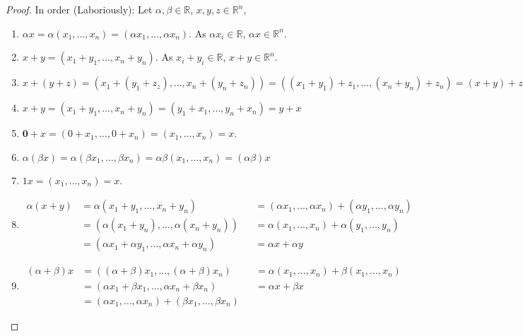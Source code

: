             \begin{proof}
            In order (Laboriously): Let $\alpha, \beta \in \mathbb{R}$, $x,y,z\in \mathbb{R}^n$,
            \begin{enumerate}
            \item $\alpha x = \alpha(x_1,\hdots,x_n) = (\alpha x_1,\hdots, \alpha x_n)$. As $\alpha x_i \in \mathbb{R}$, $\alpha x \in \mathbb{R}^n$.
            \item $x+y = (x_1+y_1,\hdots,x_n+y_n)$. As $x_i+y_i \in \mathbb{R}$, $x+y\in \mathbb{R}^n$.
            \item $x+(y+z) = (x_1+(y_1+z_z),\hdots, x_n+(y_n+z_n)) = ((x_1+y_1)+z_1,\hdots, (x_n+y_n)+z_n) = (x+y)+z$
            \item $x+y = (x_1+y_1,\hdots,x_n+y_n) = (y_1+x_1,\hdots, y_n+x_n)=y+x$
            \item $\mathbf{0}+x = (0+x_1,\hdots, 0+x_n) = (x_1,\hdots, x_n) = x$.
            \item $\alpha(\beta x) = \alpha(\beta x_1,\hdots, \beta x_n) = \alpha \beta (x_1,\hdots, x_n) = (\alpha \beta) x$
            \item $1 x = (x_1,\hdots, x_n) = x$.
            \item
                \begin{align*}
                    \alpha(x+y) &= \alpha(x_1+y_1,\hdots, x_n+y_n) & &= (\alpha x_1, \hdots, \alpha x_n) + (\alpha y_1,\hdots, \alpha y_n)\\
                    &= (\alpha(x_1+y_n),\hdots, \alpha(x_n+y_n)) & &= \alpha(x_1,\hdots, x_n)+\alpha(y_1,\hdots, y_n)\\
                    &= (\alpha x_1+\alpha y_1,\hdots, \alpha x_n + \alpha y_n) & &= \alpha x + \alpha y
                \end{align*} 
            \item
                \begin{align*}
                    (\alpha + \beta)x &= ((\alpha+\beta)x_1,\hdots, (\alpha+\beta)x_n) & &= \alpha (x_1, \hdots, x_n)+\beta (x_1, \hdots, x_n)\\
                    &= (\alpha x_1 + \beta x_1,\hdots, \alpha x_n + \beta x_n) & &= \alpha x+\beta x\\
                    &= (\alpha x_1,\hdots, \alpha x_n) + (\beta x_1,\hdots, \beta x_n)
                \end{align*}
            \end{enumerate}
            \end{proof}
